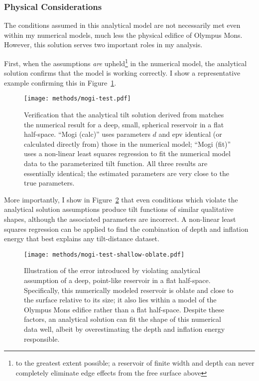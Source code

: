 \subsubsection{Physical Considerations}

The conditions assumed in this analytical model are not necessarily met even within my numerical models, much less the physical edifice of Olympus Mons. However, this solution serves two important roles in my analysis. 

First, when the assumptions \emph{are} upheld\footnote{to the greatest extent possible; a reservoir of finite width and depth can never completely eliminate edge effects from the free surface above} in the numerical model, the analytical solution confirms that the model is working correctly. I show a representative example confirming this in Figure~\ref{fig:mogi-test}.

\begin{figure}
    \texttt{[image: methods/mogi-test.pdf]}%
    \caption[Analytical solution verification]{Verification that the analytical tilt solution derived from \textcite{mogi_relations_1958} matches the numerical result for a deep, small, spherical reservoir in a flat half-space. ``Mogi (calc)'' uses parameters $d$ and \acs{epv} identical (or calculated directly from) those in the numerical model; ``Mogi (fit)'' uses a non-linear least squares regression to fit the numerical model data to the parameterized tilt function. All three results are essentially identical; the estimated parameters are very close to the true parameters.}%
    \label{fig:mogi-test}
\end{figure}

More importantly, I show in Figure~\ref{fig:mogi-test-shallow-oblate} that even conditions which violate the analytical solution assumptions produce tilt functions of similar qualitative shapes, although the associated parameters are incorrect. A non-linear least squares regression can be applied to find the combination of depth and inflation energy that best explains any tilt-distance dataset. 

\begin{figure}
    \texttt{[image: methods/mogi-test-shallow-oblate.pdf]}%
    \caption[Analytical model sensitivity to reservoir geometry]{Illustration of the error introduced by violating analytical assumption of a deep, point-like reservoir in a flat half-space. Specifically, this numerically modeled reservoir is oblate and close to the surface relative to its size; it also lies within a model of the Olympus Mons edifice rather than a flat half-space. Despite these factors, an analytical solution can fit the shape of this numerical data well, albeit by overestimating the depth and inflation energy responsible.}%
    \label{fig:mogi-test-shallow-oblate}
\end{figure}
